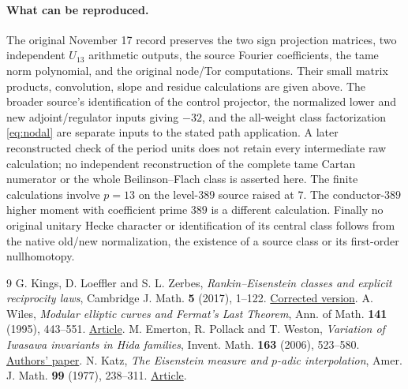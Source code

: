 \documentclass[11pt]{article}
\begin{document}
\paragraph{What can be reproduced.}
The original November 17 record preserves the two sign projection
matrices, two independent $U_{13}$ arithmetic outputs, the source
Fourier coefficients, the tame norm polynomial, and the original
node/Tor computations. Their small matrix products, convolution, slope
and residue calculations are given above. The broader source's
identification of the control projector, the normalized lower and
new adjoint/regulator inputs giving $-32$, and the all-weight class
factorization \eqref{eq:nodal} are separate inputs to the stated path
application. A later reconstructed check of the period units does not
retain every intermediate raw calculation; no independent reconstruction
of the complete tame Cartan numerator or the whole Beilinson--Flach
class is asserted here. The finite calculations involve $p=13$ on
the level-$389$ source raised at $7$. The conductor-$389$ higher
moment with coefficient prime $389$ is a different calculation.
Finally no original unitary Hecke character or identification of its
central class follows from the native old/new normalization, the
existence of a source class or its first-order nullhomotopy.

\begin{thebibliography}{9}
 G. Kings, D. Loeffler and S. L. Zerbes,
\emph{Rankin--Eisenstein classes and explicit reciprocity laws},
Cambridge J. Math. \textbf{5} (2017), 1--122.
\href{https://arxiv.org/abs/1503.02888}{Corrected version}.
 A. Wiles, \emph{Modular elliptic curves and Fermat's
Last Theorem}, Ann. of Math. \textbf{141} (1995), 443--551.
\href{https://doi.org/10.2307/2118559}{Article}.
 M. Emerton, R. Pollack and T. Weston,
\emph{Variation of Iwasawa invariants in Hida families},
Invent. Math. \textbf{163} (2006), 523--580.
\href{https://www.math.uchicago.edu/~emerton/pdffiles/iwasawa.pdf}{Authors' paper}.
 N. Katz, \emph{The Eisenstein measure and $p$-adic
interpolation}, Amer. J. Math. \textbf{99} (1977), 238--311.
\href{https://web.math.princeton.edu/~nmk/old/eismeasure.pdf}{Article}.
\end{thebibliography}
\end{document}
